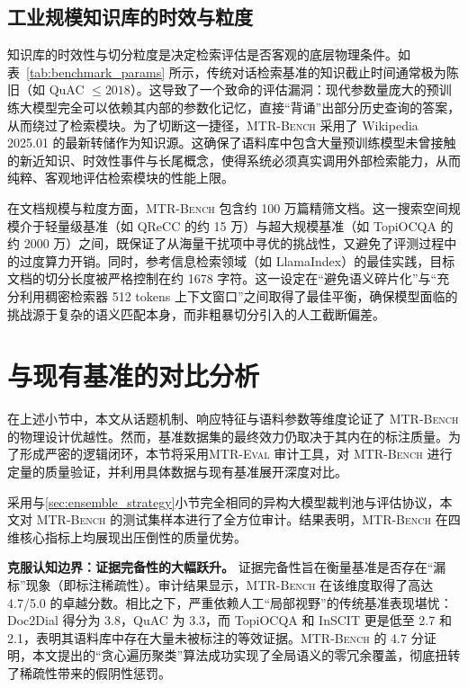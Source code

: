 \subsection{工业规模知识库的时效与粒度}

知识库的时效性与切分粒度是决定检索评估是否客观的底层物理条件。如表~\ref{tab:benchmark_params} 所示，传统对话检索基准的知识截止时间通常极为陈旧（如 QuAC $\leq 2018$）。这导致了一个致命的评估漏洞：现代参数量庞大的预训练大模型完全可以依赖其内部的参数化记忆，直接“背诵”出部分历史查询的答案，从而绕过了检索模块。为了切断这一捷径，\textsc{MTR-Bench} 采用了 Wikipedia 2025.01 的最新转储作为知识源。这确保了语料库中包含大量预训练模型未曾接触的新近知识、时效性事件与长尾概念，使得系统必须真实调用外部检索能力，从而纯粹、客观地评估检索模块的性能上限。

在文档规模与粒度方面，\textsc{MTR-Bench} 包含约 100 万篇精筛文档。这一搜索空间规模介于轻量级基准（如 QReCC 的约 15 万）与超大规模基准（如 TopiOCQA 的约 2000 万）之间，既保证了从海量干扰项中寻优的挑战性，又避免了评测过程中的过度算力开销。同时，参考信息检索领域（如 LlamaIndex）的最佳实践，目标文档的切分长度被严格控制在约 1678 字符。这一设定在“避免语义碎片化”与“充分利用稠密检索器 512 tokens 上下文窗口”之间取得了最佳平衡，确保模型面临的挑战源于复杂的语义匹配本身，而非粗暴切分引入的人工截断偏差。


\section{与现有基准的对比分析}
\label{sec:bench_audit}

在上述小节中，本文从话题机制、响应特征与语料参数等维度论证了 \textsc{MTR-Bench} 的物理设计优越性。然而，基准数据集的最终效力仍取决于其内在的标注质量。为了形成严密的逻辑闭环，本节将采用\textsc{MTR-Eval} 审计工具，对 \textsc{MTR-Bench} 进行定量的质量验证，并利用具体数据与现有基准展开深度对比。

采用与\ref{sec:ensemble_strategy}小节完全相同的异构大模型裁判池与评估协议，本文对 \textsc{MTR-Bench} 的测试集样本进行了全方位审计。结果表明，\textsc{MTR-Bench} 在四维核心指标上均展现出压倒性的质量优势。

\textbf{克服认知边界：证据完备性的大幅跃升。} 证据完备性旨在衡量基准是否存在“漏标”现象（即标注稀疏性）。审计结果显示，\textsc{MTR-Bench} 在该维度取得了高达 4.7/5.0 的卓越分数。相比之下，严重依赖人工“局部视野”的传统基准表现堪忧：Doc2Dial 得分为 3.8，QuAC 为 3.3，而 TopiOCQA 和 InSCIT 更是低至 2.7 和 2.1，表明其语料库中存在大量未被标注的等效证据。\textsc{MTR-Bench} 的 4.7 分证明，本文提出的“贪心遍历聚类”算法成功实现了全局语义的零冗余覆盖，彻底扭转了稀疏性带来的假阴性惩罚。


